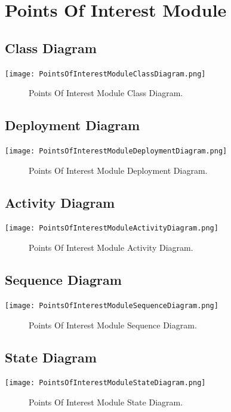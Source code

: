 \documentclass[12pt]{article}
\begin{document}
   
   \section{Points Of Interest Module}
	
	\subsection{Class Diagram}
        \texttt{[image: PointsOfInterestModuleClassDiagram.png]}
        \begin{figure}[h]
            \caption{Points Of Interest Module Class Diagram.}
        \end{figure}
    
    \subsection{Deployment Diagram}
        \texttt{[image: PointsOfInterestModuleDeploymentDiagram.png]}
        \begin{figure}[h]
            \caption{Points Of Interest Module Deployment Diagram.}
        \end{figure}
        
    \subsection{Activity Diagram}
        \texttt{[image: PointsOfInterestModuleActivityDiagram.png]}
        \begin{figure}[h]
            \caption{Points Of Interest Module Activity Diagram.}
        \end{figure}

    \subsection{Sequence Diagram}
        \texttt{[image: PointsOfInterestModuleSequenceDiagram.png]}
        \begin{figure}[h]
            \caption{Points Of Interest Module Sequence Diagram.}
        \end{figure}

	
	\subsection{State Diagram}
       \texttt{[image: PointsOfInterestModuleStateDiagram.png]}
        \begin{figure}[h]
        	\caption{Points Of Interest Module State Diagram.}
        \end{figure}
	
\end{document}
